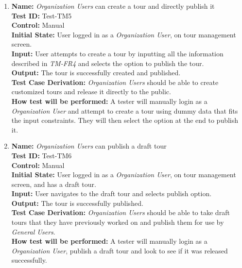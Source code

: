 \documentclass[12pt, titlepage]{article}
\begin{document}
\begin{enumerate}
    \item
    \textbf{Name:} \textit{Organization Users} can create a tour and directly publish it \label{itm:Test-TM5} \\
    \textbf{Test ID:} Test-TM5 \\
    \textbf{Control:} Manual \\
    \textbf{Initial State:} User logged in as a \textit{Organization User}, on tour management screen. \\
    \textbf{Input:} User attempts to create a tour by inputting all the information described in \textit{TM-FR4} and selects the option to publish the tour. \\
    \textbf{Output:} The tour is successfully created and published. \\
    \textbf{Test Case Derivation:} \textit{Organization Users} should be able to create customized tours and release it directly to the public. \\
    \textbf{How test will be performed:} A tester will manually login as a \textit{Organization User} and attempt to create a tour using dummy data that fits the input constraints. They will then select the option at the end to publish it.

    \item
    \textbf{Name:} \textit{Organization Users} can publish a draft tour \label{itm:Test-TM6} \\
    \textbf{Test ID:} Test-TM6 \\
    \textbf{Control:} Manual \\
    \textbf{Initial State:} User logged in as a \textit{Organization User}, on tour management screen, and has a draft tour. \\
    \textbf{Input:} User navigates to the draft tour and selects publish option. \\
    \textbf{Output:} The tour is successfully published. \\
    \textbf{Test Case Derivation:} \textit{Organization Users} should be able to take draft tours that they have previously worked on and publish them for use by \textit{General Users}. \\
    \textbf{How test will be performed:} A tester will manually login as a \textit{Organization User}, publish a draft tour and look to see if it was released successfully.


\end{enumerate}
\end{document}
